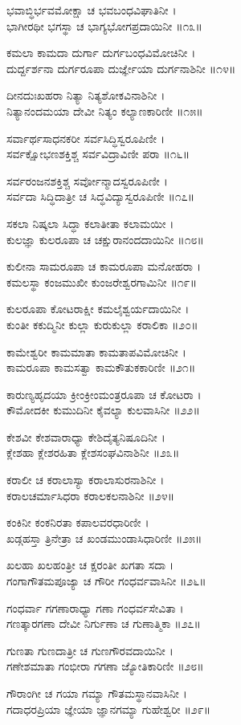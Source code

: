 ಭವಾಬ್ಧಿರ್ಭವಮೋಕ್ಷಾ ಚ ಭವಬಂಧವಿಘಾತಿನೀ ।\\
ಭಾಗೀರಥೀ ಭಗಸ್ಥಾ ಚ ಭಾಗ್ಯಭೋಗಪ್ರದಾಯಿನೀ ॥೧೩॥

ಕಮಲಾ ಕಾಮದಾ ದುರ್ಗಾ ದುರ್ಗಬಂಧವಿಮೋಚಿನೀ ।\\
ದುರ್ದ್ದರ್ಶನಾ ದುರ್ಗರೂಪಾ ದುರ್ಜ್ಞೇಯಾ ದುರ್ಗನಾಶಿನೀ ॥೧೪॥

ದೀನದುಃಖಹರಾ ನಿತ್ಯಾ ನಿತ್ಯಶೋಕವಿನಾಶಿನೀ ।\\
ನಿತ್ಯಾನಂದಮಯಾ ದೇವೀ ನಿತ್ಯಂ ಕಲ್ಯಾಣಕಾರಿಣೀ ॥೧೫॥

ಸರ್ವಾರ್ಥಸಾಧನಕರೀ ಸರ್ವಸಿದ್ಧಿಸ್ವರೂಪಿಣೀ ।\\
ಸರ್ವಕ್ಷೋಭಣಶಕ್ತಿಶ್ಚ ಸರ್ವವಿದ್ರಾವಿಣೀ ಪರಾ ॥೧೬॥

ಸರ್ವರಂಜನಶಕ್ತಿಶ್ಚ ಸರ್ವೋನ್ಮಾದಸ್ವರೂಪಿಣೀ ।\\
ಸರ್ವದಾ ಸಿದ್ಧಿದಾತ್ರೀ ಚ ಸಿದ್ಧವಿದ್ಯಾಸ್ವರೂಪಿಣೀ ॥೧೭॥

ಸಕಲಾ ನಿಷ್ಕಲಾ ಸಿದ್ಧಾ ಕಲಾತೀತಾ ಕಲಾಮಯೀ ।\\
ಕುಲಜ್ಞಾ ಕುಲರೂಪಾ ಚ ಚಕ್ಷುರಾನಂದದಾಯಿನೀ ॥೧೮॥

ಕುಲೀನಾ ಸಾಮರೂಪಾ ಚ ಕಾಮರೂಪಾ ಮನೋಹರಾ ।\\
ಕಮಲಸ್ಥಾ ಕಂಜಮುಖೀ ಕುಂಜರೇಶ್ವರಗಾಮಿನೀ ॥೧೯॥

ಕುಲರೂಪಾ ಕೋಟರಾಕ್ಷೀ ಕಮಲೈಶ್ವರ್ಯದಾಯಿನೀ ।\\
ಕುಂತೀ ಕಕುದ್ಮಿನೀ ಕುಲ್ಲಾ ಕುರುಕುಲ್ಲಾ ಕರಾಲಿಕಾ ॥೨೦॥

ಕಾಮೇಶ್ವರೀ ಕಾಮಮಾತಾ ಕಾಮತಾಪವಿಮೋಚಿನೀ ।\\
ಕಾಮರೂಪಾ ಕಾಮಸತ್ವಾ ಕಾಮಕೌತುಕಕಾರಿಣೀ ॥೨೧॥

ಕಾರುಣ್ಯಹೃದಯಾ ಕ್ರೀಂಕ್ರೀಂಮಂತ್ರರೂಪಾ ಚ ಕೋಟರಾ ।\\
ಕೌಮೋದಕೀ ಕುಮುದಿನೀ ಕೈವಲ್ಯಾ ಕುಲವಾಸಿನೀ ॥೨೨॥

ಕೇಶವೀ ಕೇಶವಾರಾಧ್ಯಾ ಕೇಶಿದೈತ್ಯನಿಷೂದಿನೀ ।\\
ಕ್ಲೇಶಹಾ ಕ್ಲೇಶರಹಿತಾ ಕ್ಲೇಶಸಂಘವಿನಾಶಿನೀ ॥೨೩॥

ಕರಾಲೀ ಚ ಕರಾಲಾಸ್ಯಾ ಕರಾಲಾಸುರನಾಶಿನೀ ।\\
ಕರಾಲಚರ್ಮಾಸಿಧರಾ ಕರಾಲಕಲನಾಶಿನೀ ॥೨೪॥

ಕಂಕಿನೀ ಕಂಕನಿರತಾ ಕಪಾಲವರಧಾರಿಣೀ ।\\
ಖಡ್ಗಹಸ್ತಾ ತ್ರಿನೇತ್ರಾ ಚ ಖಂಡಮುಂಡಾಸಿಧಾರಿಣೀ ॥೨೫॥

ಖಲಹಾ ಖಲಹಂತ್ರೀ ಚ ಕ್ಷರಂತೀ ಖಗತಾ ಸದಾ ।\\
ಗಂಗಾಗೌತಮಪೂಜ್ಯಾ ಚ ಗೌರೀ ಗಂಧರ್ವವಾಸಿನೀ ॥೨೬॥

ಗಂಧರ್ವಾ ಗಗಣಾರಾಧ್ಯಾ ಗಣಾ ಗಂಧರ್ವಸೇವಿತಾ ।\\
ಗಣತ್ಕಾರಗಣಾ ದೇವೀ ನಿರ್ಗುಣಾ ಚ ಗುಣಾತ್ಮಿಕಾ ॥೨೭॥

ಗುಣತಾ ಗುಣದಾತ್ರೀ ಚ ಗುಣಗೌರವದಾಯಿನೀ ।\\
ಗಣೇಶಮಾತಾ ಗಂಭೀರಾ ಗಗಣಾ ಜ್ಯೋತಿಕಾರಿಣೀ ॥೨೮॥

ಗೌರಾಂಗೀ ಚ ಗಯಾ ಗಮ್ಯಾ ಗೌತಮಸ್ಥಾನವಾಸಿನೀ ।\\
ಗದಾಧರಪ್ರಿಯಾ ಜ್ಞೇಯಾ ಜ್ಞಾನಗಮ್ಯಾ ಗುಹೇಶ್ವರೀ ॥೨೯॥

